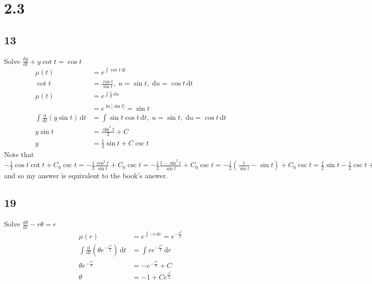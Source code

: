 \documentclass{article}
\begin{document}
\section*{2.3}
\subsection*{13}
Solve \(\frac{\mathrm{d}y}{\mathrm{d}t}+y\cot{t}=\cos{t}\)
\begin{align*}
\mu (t)&=e^{\int{\cot{t}\,\mathrm{d}t}}\\
\cot t&=\frac{\cos t}{\sin t},\;u=\sin t,\;\mathrm{d}u=\cos t\,\mathrm{d}t\\
\mu(t)&=e^{\int{\frac{1}{u}\,\mathrm{d}u}}\\
&=e^{\ln\left\lvert\sin t\right\rvert}=\sin t\\
\int{\frac{\mathrm{d}}{\mathrm{d}t}\left(y\sin t\right)\,\mathrm{d}t}&=\int{\sin{t}\cos{t}\,\mathrm{d}t},\;u=\sin t,\;\mathrm{d}u=\cos t\,\mathrm{d}t\\
y\sin t&=\frac{\sin^2 t}{2}+C\\
y&=\frac{1}{2}\sin t+C\csc t
\end{align*}
Note that \(-\frac{1}{2}\cos t \cot t+C_0\csc t=-\frac{1}{2}\frac{\cos^2 t}{\sin t}+C_0\csc t=-\frac{1}{2}\frac{1-\sin^2 t}{\sin t}+C_0\csc t=-\frac{1}{2}\left(\frac{1}{\sin t}-\sin t\right)+C_0\csc t=\frac{1}{2}\sin t-\frac{1}{2}\csc t+C_0\csc t=\frac{1}{2}\sin t+(C_0-\frac{1}{2})\csc t=\frac{1}{2}\sin t+C_1\csc t\) and so my answer is equivalent to the book's answer.
\subsection*{19}
Solve \(\frac{\mathrm{d}\theta}{\mathrm{d}r}-r\theta=r\)
\begin{align*}
\mu(r)&=e^{\int{-r\,\mathrm{d}r}}=e^{-\frac{r^2}{2}}\\
\int{\frac{\mathrm{d}}{\mathrm{d}t}\left(\theta e^{-\frac{r^2}{2}}\right)\,\mathrm{d}t}&=\int{r e^{-\frac{r^2}{2}}\,\mathrm{d}r}\\
\theta e^{-\frac{r^2}{2}}&=-e^{-\frac{r^2}{2}}+C\\
\theta&=-1+Ce^{\frac{r^2}{2}}
\end{align*}
\end{document}
